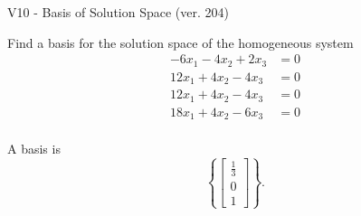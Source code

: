 \begin{exercise}
  \begin{exerciseTitle}V10 - Basis of Solution Space (ver. 204)\end{exerciseTitle}
  \begin{exerciseStatement}
    Find a basis for the solution space of the homogeneous system 
\begin{align*}
 -6 x_ 1 -4 x_ 2 + 2 x_ 3 &= 0  \\ 
  12 x_ 1 + 4 x_ 2 -4 x_ 3 &= 0  \\ 
  12 x_ 1 + 4 x_ 2 -4 x_ 3 &= 0  \\ 
  18 x_ 1 + 4 x_ 2 -6 x_ 3 &= 0  \\ 
 \end{align*}


 
  \end{exerciseStatement}

  \begin{exerciseAnswer}
   A basis is   
\[\left\{\left[\begin{array}{c}
\frac{1}{3} \\
0 \\
1
\end{array}\right]\right\}.\]

  


  \end{exerciseAnswer}
\end{exercise}